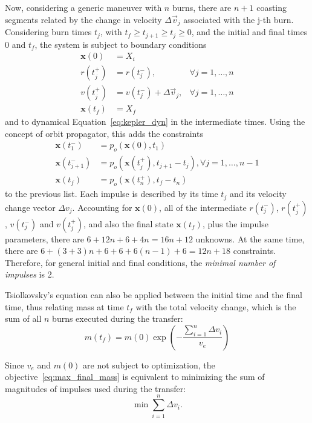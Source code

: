 Now, considering a generic maneuver with \(n\) burns, there are \(n+1\) coasting segments related by the change in velocity \(\Delta \vec v_j\) associated with the j-th burn. Considering burn times \(t_j\), with \(t_f \geq t_{j+1} \geq t_j \geq 0\), and the initial and final times \(0\) and \(t_f\), the system is subject to boundary conditions
\begin{align}
    \mathbf{x}(0) &= X_i \\
    r(t_j^+) &= r(t_j^-),& \forall j=1,\dots,n \\
    v(t_j^+) &= v(t_j^-) + \Delta \vec v_j,& \forall j=1,\dots,n \\
    \mathbf{x}(t_f) &= X_f
\end{align}
and to dynamical Equation~\eqref{eq:kepler_dyn} in the intermediate times. Using the concept of orbit propagator, this adds the constraints
\begin{align}
    \mathbf{x}(t_1^-) &= p_o(\mathbf{x}(0), t_1) \\
    \mathbf{x}(t_{j+1}^-) &= p_o(\mathbf{x}(t_j^+), t_{j+1} - t_j), \forall j = 1, \dots, n-1 \\
    \mathbf{x}(t_f) &= p_o(\mathbf{x}(t_n^+), t_f - t_n)
\end{align}
to the previous list. Each impulse is described by its time \(t_j\) and its velocity change vector \(\Delta v_j\). Accounting for \(\mathbf{x}(0)\), all of the intermediate \(r(t_j^-)\), \(r(t_j^+)\), \(v(t_j^-)\) and \(v(t_j^+)\), and also the final state \(\mathbf{x}(t_f)\), plus the impulse parameters, there are \(6 + 12n + 6 + 4n = 16n + 12\) unknowns. At the same time, there are \(6 + (3 + 3)n + 6 + 6 + 6(n-1) + 6 = 12n + 18\) constraints. Therefore, for general initial and final conditions, the \textit{minimal number of impulses} is 2. 


Tsiolkovsky's equation can also be applied between the initial time and the final time, thus relating mass at time \(t_f\) with the total velocity change, which is the sum of all \(n\) burns executed during the transfer:
\begin{equation}
    m(t_f) = m(0) \exp{\left(-\frac{\sum_{i=1}^{n}\Delta v_i}{v_e}\right)}
\end{equation}

Since \(v_e\) and \(m(0)\) are not subject to optimization, the objective~\eqref{eq:max_final_mass} is equivalent to minimizing the sum of magnitudes of impulses used during the transfer:
\begin{equation}
    \min \sum_{i=1}^{n} \Delta v_i.
\end{equation}

